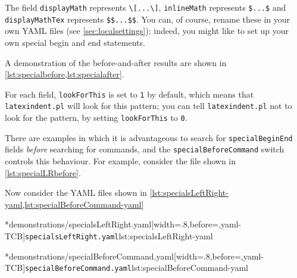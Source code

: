 	The field \texttt{displayMath} represents \lstinline!\[...\]!, \texttt{inlineMath} represents \lstinline!$...$! and \texttt{displayMathTex} represents \lstinline!$$...$$!.
	You can, of course, rename these in your own YAML files (see \vref{sec:localsettings}); indeed, you might like to set up your own special begin and end statements.

	A demonstration of the before-and-after results are shown in \cref{lst:specialbefore,lst:specialafter}.

	\begin{minipage}{.45\textwidth}
	\end{minipage}%
	\hfill
	\begin{minipage}{.45\textwidth}
	\end{minipage}

	For each field, \texttt{lookForThis} is set to \texttt{1} by default, which means that \texttt{latexindent.pl} will look for this pattern; you can tell \texttt{latexindent.pl} not to look for the pattern, by setting \texttt{lookForThis} to \texttt{0}.

	There are%
	 examples in which it is advantageous to search for \texttt{specialBeginEnd} fields \emph{before} searching for commands, and the \texttt{specialBeforeCommand} switch controls this behaviour.
	For example, consider the file shown in \cref{lst:specialLRbefore}.


	Now consider the YAML files shown in \cref{lst:specialsLeftRight-yaml,lst:specialBeforeCommand-yaml} 

	\begin{minipage}{.49\linewidth}
		\cmhlistingsfromfile[]*{demonstrations/specialsLeftRight.yaml}[width=.8\linewidth,before=\centering,yaml-TCB]{\texttt{specialsLeftRight.yaml}}{lst:specialsLeftRight-yaml}
	\end{minipage} \hfill
	\begin{minipage}{.49\linewidth}
		\cmhlistingsfromfile[]*{demonstrations/specialBeforeCommand.yaml}[width=.8\linewidth,before=\centering,yaml-TCB]{\texttt{specialBeforeCommand.yaml}}{lst:specialBeforeCommand-yaml}
	\end{minipage} 

